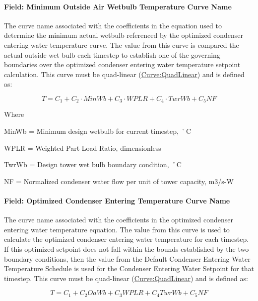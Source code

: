 \paragraph{Field: Minimum Outside Air Wetbulb Temperature Curve Name}\label{field-minimum-outside-air-wetbulb-temperature-curve-name}

The curve name associated with the coefficients in the equation used to determine the minimum actual wetbulb referenced by the optimized condenser entering water temperature curve. The value from this curve is compared the actual outside wet bulb each timestep to establish one of the governing boundaries over the optimized condenser entering water temperature setpoint calculation. This curve must be quad-linear (\hyperref[curvequadlinear]{Curve:QuadLinear}) and is defined as:

\begin{equation}
T = {C_1} + {C_2}\cdot MinWb + {C_3}\cdot WPLR + {C_4}\cdot TwrWb + {C_5}NF
\end{equation}

Where

MinWb = Minimum design wetbulb for current timestep, ˚C

WPLR = Weighted Part Load Ratio, dimensionless

TwrWb = Design tower wet bulb boundary condition, ˚C

NF = Normalized condenser water flow per unit of tower capacity, m3/s-W

\paragraph{Field: Optimized Condenser Entering Temperature Curve Name}\label{field-optimized-condenser-entering-temperature-curve-name}

The curve name associated with the coefficients in the optimized condenser entering water temperature equation. The value from this curve is used to calculate the optimized condenser entering water temperature for each timestep. If this optimized setpoint does not fall within the bounds established by the two boundary conditions, then the value from the Default Condenser Entering Water Temperature Schedule is used for the Condenser Entering Water Setpoint for that timestep. This curve must be quad-linear (\hyperref[curvequadlinear]{Curve:QuadLinear}) and is defined as:

\begin{equation}
T = {C_1} + {C_2}OaWb + {C_3}WPLR + {C_4}TwrWb + {C_5}NF
\end{equation}

